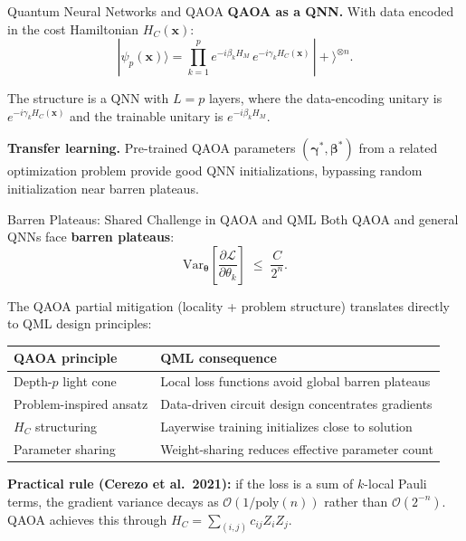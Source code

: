 \documentclass{beamer}
\begin{document}
\begin{frame}
\begin{frame}{Quantum Neural Networks and QAOA}
\textbf{QAOA as a QNN.}  With data encoded in the cost Hamiltonian
$H_C(\mathbf{x})$:
\[
|\psi_p(\mathbf{x})\rangle
= \prod_{k=1}^p e^{-i\beta_k H_M}\,e^{-i\gamma_k H_C(\mathbf{x})}\,
|+\rangle^{\otimes n}.
\]

The structure is a QNN with $L=p$ layers, where the data-encoding
unitary is $e^{-i\gamma_k H_C(\mathbf{x})}$ and the trainable unitary
is $e^{-i\beta_k H_M}$.

\medskip

\textbf{Transfer learning.}  Pre-trained QAOA parameters
$(\boldsymbol{\gamma}^*,\boldsymbol{\beta}^*)$ from a related
optimization problem provide good QNN initializations, bypassing
random initialization near barren plateaus.
\end{frame}


\begin{frame}{Barren Plateaus: Shared Challenge in QAOA and QML}
Both QAOA and general QNNs face \textbf{barren plateaus}:
\[
\mathrm{Var}_{\boldsymbol{\theta}}\!\left[\frac{\partial\mathcal{L}}{\partial\theta_k}\right]
\;\leq\; \frac{C}{2^n}.
\]

The QAOA partial mitigation (locality + problem structure) translates
directly to QML design principles:

\medskip

\begin{center}
\small
\begin{tabular}{ll}
\hline
\textbf{QAOA principle} & \textbf{QML consequence} \\
\hline
Depth-$p$ light cone & Local loss functions avoid global barren plateaus \\
Problem-inspired ansatz & Data-driven circuit design concentrates gradients \\
$H_C$ structuring & Layerwise training initializes close to solution \\
Parameter sharing & Weight-sharing reduces effective parameter count \\
\hline
\end{tabular}
\end{center}

\medskip

\textbf{Practical rule (Cerezo et al.\ 2021):} if the loss is a sum
of $k$-local Pauli terms, the gradient variance decays as
$\mathcal{O}(1/\mathrm{poly}(n))$ rather than $\mathcal{O}(2^{-n})$.
QAOA achieves this through $H_C = \sum_{(i,j)} c_{ij}Z_iZ_j$.
\end{frame}


\end{frame}
\end{document}
